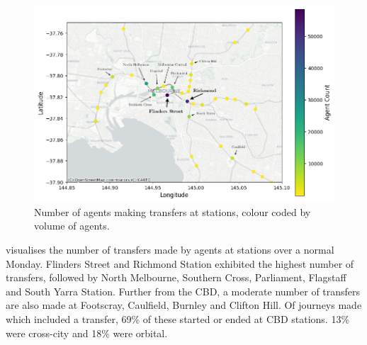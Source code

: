 \begin{figure}[ht]
    \centering
    \includegraphics[width=1\linewidth]{images/Case_Study/transfer_map_labelled.png}
    \caption{Number of agents making transfers at stations, colour coded by volume of agents.}
    \label{fig:transfer-map}
\end{figure}

 visualises the number of transfers made by agents at stations over a normal Monday. Flinders Street and Richmond Station exhibited the highest number of transfers, followed by North Melbourne, Southern Cross, Parliament, Flagstaff and South Yarra Station. Further from the CBD, a moderate number of transfers are also made at Footscray, Caulfield, Burnley and Clifton Hill. Of journeys made which included a transfer, 69\% of these started or ended at CBD stations. 13\% were cross-city and 18\% were orbital. 




